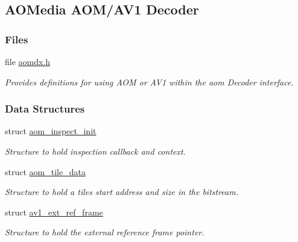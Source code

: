 \hypertarget{group__aom__decoder}{}\subsection{A\+O\+Media A\+O\+M/\+A\+V1 Decoder}
\label{group__aom__decoder}
\subsubsection*{Files}
\begin{DoxyCompactItemize}
\item 
file \hyperlink{aomdx_8h}{aomdx.\+h}
\begin{DoxyCompactList}\small\item\em Provides definitions for using A\+OM or A\+V1 within the aom Decoder interface. \end{DoxyCompactList}\end{DoxyCompactItemize}
\subsubsection*{Data Structures}
\begin{DoxyCompactItemize}
\item 
struct \hyperlink{structaom__inspect__init}{aom\+\_\+inspect\+\_\+init}
\begin{DoxyCompactList}\small\item\em Structure to hold inspection callback and context. \end{DoxyCompactList}\item 
struct \hyperlink{structaom__tile__data}{aom\+\_\+tile\+\_\+data}
\begin{DoxyCompactList}\small\item\em Structure to hold a tile\textquotesingle{}s start address and size in the bitstream. \end{DoxyCompactList}\item 
struct \hyperlink{structav1__ext__ref__frame}{av1\+\_\+ext\+\_\+ref\+\_\+frame}
\begin{DoxyCompactList}\small\item\em Structure to hold the external reference frame pointer. \end{DoxyCompactList}\end{DoxyCompactItemize}
